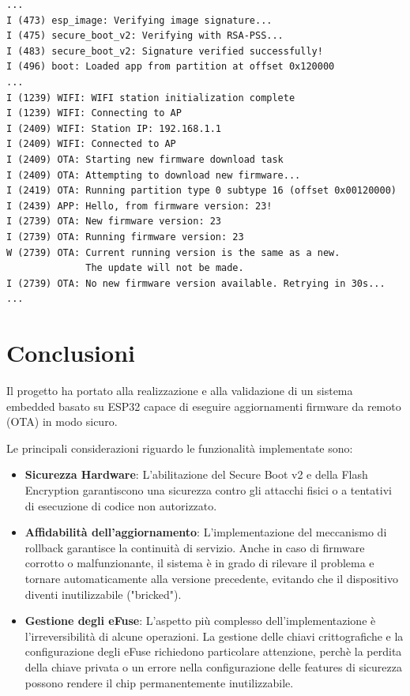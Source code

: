 \documentclass[a4paper]{article}
\begin{document}
\begin{lstlisting}[breaklines=false, basicstyle=\ttfamily\scriptsize]
...
I (473) esp_image: Verifying image signature...
I (475) secure_boot_v2: Verifying with RSA-PSS...
I (483) secure_boot_v2: Signature verified successfully!
I (496) boot: Loaded app from partition at offset 0x120000
...
I (1239) WIFI: WIFI station initialization complete
I (1239) WIFI: Connecting to AP
I (2409) WIFI: Station IP: 192.168.1.1
I (2409) WIFI: Connected to AP
I (2409) OTA: Starting new firmware download task
I (2409) OTA: Attempting to download new firmware...
I (2419) OTA: Running partition type 0 subtype 16 (offset 0x00120000)
I (2439) APP: Hello, from firmware version: 23!
I (2739) OTA: New firmware version: 23
I (2739) OTA: Running firmware version: 23
W (2739) OTA: Current running version is the same as a new.
              The update will not be made.
I (2739) OTA: No new firmware version available. Retrying in 30s...
...
\end{lstlisting}

\section{Conclusioni}
Il progetto ha portato alla realizzazione e alla validazione di un sistema embedded
basato su ESP32 capace di eseguire aggiornamenti firmware da remoto (OTA) in modo
sicuro.

\vspace{1em}
\noindent
Le principali considerazioni riguardo le funzionalità implementate sono:

\begin{itemize}
  \item \textbf{Sicurezza Hardware}: L'abilitazione del Secure Boot v2 e della
    Flash Encryption garantiscono una sicurezza contro gli attacchi fisici
    o a tentativi di esecuzione di codice non autorizzato.

  \item \textbf{Affidabilità dell'aggiornamento}: L'implementazione del meccanismo di
    rollback garantisce la continuità di servizio. Anche in caso di
    firmware corrotto o malfunzionante, il sistema è in grado di rilevare il problema
    e tornare automaticamente alla versione precedente, evitando che il dispositivo
    diventi inutilizzabile ("bricked").

  \item \textbf{Gestione degli eFuse}: L'aspetto più complesso dell'implementazione
    è l'irreversibilità di alcune operazioni. La gestione delle chiavi
    crittografiche e la configurazione degli eFuse richiedono particolare
    attenzione, perchè la perdita della chiave privata o un errore nella
    configurazione delle features di sicurezza possono rendere il chip
    permanentemente inutilizzabile.
\end{itemize}

\nocite{*}
\printbibliography[
heading=bibintoc,
title={Bibliografia}
]
\end{document}
